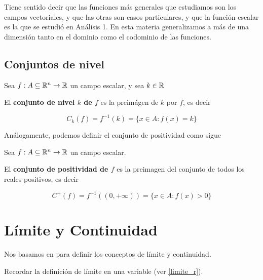 Tiene sentido decir que las funciones más generales que estudiamos son los campos vectoriales, y que las otras son casos particulares, y que la función escalar es la que se estudió en Análisis 1.  En esta materia generalizamos a más de una dimensión tanto en el dominio como el codominio de las funciones.

\section{Conjuntos de nivel}

\begin{definition}
Sea $f : A \subseteq \mathbb{R}^n \to \mathbb{R}$ un campo escalar, y sea $k \in \mathbb{R}$

El \textbf{conjunto de nivel $k$ de $f$}  es la preimágen de $k$ por $f$, es decir 

$$ C_k(f) = f^{-1}(k) = \{x \in A : f(x) = k \} $$
\end{definition}

Análogamente, podemos definir el conjunto de positividad como sigue

\begin{definition}[Positividad]
Sea $f : A \subseteq \mathbb{R}^n \to \mathbb{R}$ un campo escalar.

El \textbf{conjunto de positividad de $f$} es la preimagen del conjunto de todos los reales positivos, es decir

$$ C^+(f) = f^{-1}((0,+\infty)) = \{x \in A : f(x) > 0 \} $$
\end{definition}



\chapter{Límite y Continuidad}

Nos basamos en \textcite{libro:1} para definir los conceptos de límite y continuidad.

Recordar la definición de límite en una variable (ver \ref{limite_r}).

